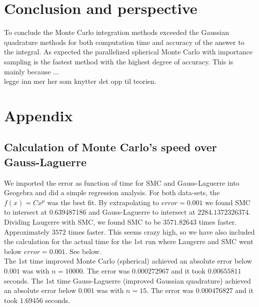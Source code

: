 \documentclass{article}
\begin{document}
\vspace{1cm}

\section{Conclusion and perspective} \label{sec:Conclusion}

To conclude the Monte Carlo integration methods exceeded the Gaussian quadrature methods for both computation time and accuracy of the answer to the integral. As expected the parallelized spherical Monte Carlo with importance sampling is the fastest method with the highest degree of accuracy. This is mainly because ... \\

legge inn mer her som knytter det opp til teorien.


\vspace{1cm}

\section{Appendix} \label{sec:Appendix}

\subsection{Calculation of Monte Carlo's speed over Gauss-Laguerre}  \label{MC>GQ}
We imported the error as function of time for SMC and Gauss-Laguerre into Geogebra and did a simple regression analysis. For both data-sets, the $f(x)=Cx^p$ was the best fit. By extrapolating to $error=0.001$ we found SMC to intersect at $0.639487186$ and Gauss-Laguerre to intersect at
$2284.1372326374$. Dividing Laugerre with SMC, we found SMC to be $3571.82643$ times faster. Approximately $3572$ times faster. This seems crazy high, so we
have also included the calculation for the actual time for the 1st run where Laugerre and SMC went below $error=0.001$. See below.\\

The 1st time improved Monte Carlo (spherical) achieved an absolute error below $0.001$ was with $n=10000$. The error was $0.000272967$ and it took
$0.00655811$ seconds. The 1st time Gauss-Laguerre (improved Gaussian quadrature) achieved an absolute error below $0.001$ was with $n=15$. The error was $0.000476827$ and it took $1.69456$ seconds. \\
\end{document}
